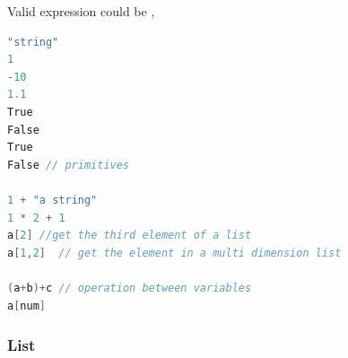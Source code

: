Valid expression could be ,
\begin{lstlisting}[language=java]
"string"
1
-10 
1.1
True
False
True 
False // primitives 

1 + "a string"
1 * 2 + 1  
a[2] //get the third element of a list
a[1,2]  // get the element in a multi dimension list

(a+b)+c // operation between variables
a[num] 
\end{lstlisting}


\subsubsection*{List}



